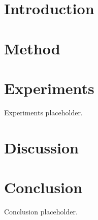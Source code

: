 ﻿\documentclass[11pt]{article}
\title{\workingtitle}
\author{\authorplaceholder \\ \affiliationplaceholder}
\date{}
\begin{document}
\maketitle

\section{Introduction}\nonfinalnote\par[Section content placeholder.]
\section{Method}\nonfinalnote\par 
\section{Experiments}\nonfinalnote\par Experiments placeholder. 
\section{Discussion}\nonfinalnote\par 
\section{Conclusion}\nonfinalnote\par Conclusion placeholder.

\end{document}
